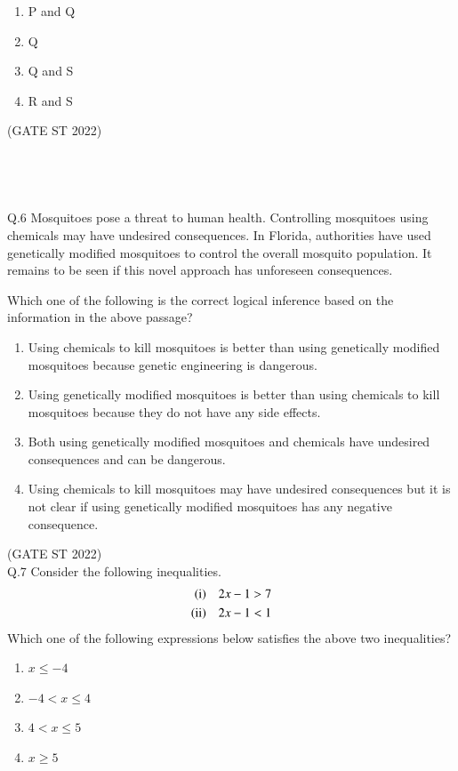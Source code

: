\documentclass[journal,12pt,onecolumn]{IEEEtran}
\theoremstyle{remark}
\begin{document}
\begin{multicols}{4}
\begin{enumerate}
\item P and Q
\item Q
\item Q and S
\item R and S

\end{enumerate}
\end{multicols}
\hfill (GATE ST 2022)\\
	 \pagebreak
	 \\
	 \\
	 \\
	 \\
Q.6 Mosquitoes pose a threat to human health. Controlling mosquitoes using chemicals may have undesired consequences. In Florida, authorities have used genetically modified mosquitoes to control the overall mosquito population. It remains to be seen if this novel approach has unforeseen consequences.
	
Which one of the following is the correct logical inference based on the information in the above passage?
\begin{enumerate}[label=(\Alph*)]
		\item Using chemicals to kill mosquitoes is better than using genetically modified mosquitoes because genetic engineering is dangerous.
		\item Using genetically modified mosquitoes is better than using chemicals to kill mosquitoes because they do not have any side effects.
		\item Both using genetically modified mosquitoes and chemicals have undesired consequences and can be dangerous.
		\item Using chemicals to kill mosquitoes may have undesired consequences but it is not clear if using genetically modified mosquitoes has any negative consequence.
\end{enumerate} 
\hfill (GATE ST 2022)\\
	\vspace{2em}
Q.7 Consider the following inequalities.
\begin{align*}
	\text{(\romannumeral 1)} & \quad 2x - 1 > 7 \\
	\text{(\romannumeral 2)} & \quad 2x - 1 < 1
\end{align*}
Which one of the following expressions below satisfies the above two inequalities?
\begin{multicols}{2} 
	\begin{enumerate}[label=(\Alph*)]
		\item $x \leq -4$
		\item $-4 < x \leq 4$
		\item $4 < x \leq 5$
		\item $x \geq 5$
	\end{enumerate}
\end{multicols}
\end{document}
